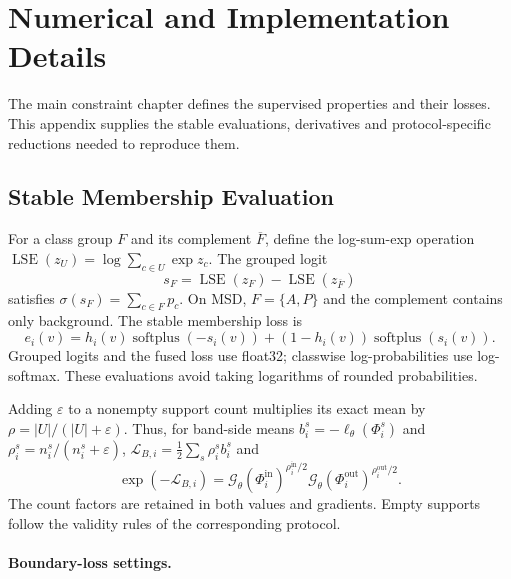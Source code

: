 \documentclass[12pt,a4paper]{article}
\begin{document}
\section{Numerical and Implementation Details}
\label{sec:technical-details}

The main constraint chapter defines the supervised properties and their
losses. This appendix supplies the stable evaluations, derivatives and
protocol-specific reductions needed to reproduce them.

\subsection{Stable Membership Evaluation}

For a class group $F$ and its complement $\overline F$, define the
log-sum-exp operation $\operatorname{LSE}(z_U)=\log\sum_{c\in U}\exp z_c$. The grouped logit
\begin{equation}
s_F=\operatorname{LSE}(z_F)-\operatorname{LSE}(z_{\overline F})
\label{eq:grouped-predicate-logit}
\end{equation}
satisfies $\sigma(s_F)=\sum_{c\in F}p_c$. On MSD, $F=\{A,P\}$
and the complement contains only background. The stable membership loss is
\begin{equation}
e_i(v)=h_i(v)\operatorname{softplus}(-s_i(v))
       +(1-h_i(v))\operatorname{softplus}(s_i(v)).
\label{eq:band-stable-bce}
\end{equation}
Grouped logits and the fused loss use float32; classwise log-probabilities
use log-softmax. These evaluations avoid taking logarithms of rounded
probabilities.

Adding $\varepsilon$ to a nonempty support count multiplies its exact
mean by $\rho=|U|/(|U|+\varepsilon)$. Thus, for band-side means
$b_i^s=-\ell_\theta(\Phi_i^s)$ and
$\rho_i^s=n_i^s/(n_i^s+\varepsilon)$,
$\mathcal L_{B,i}=\tfrac12\sum_s\rho_i^s b_i^s$ and
\begin{equation}
\exp(-\mathcal{L}_{B,i})
=\mathcal{G}_\theta(\Phi_i^{\mathrm{in}})^{\rho_i^{\mathrm{in}}/2}
 \mathcal{G}_\theta(\Phi_i^{\mathrm{out}})^{\rho_i^{\mathrm{out}}/2}.
\label{eq:balanced-band-satisfaction}
\end{equation}
The count factors are retained in both values and gradients. Empty
supports follow the validity rules of the corresponding protocol.

\paragraph{Boundary-loss settings.}
\label{sec:band-implementation-details}
\end{document}
